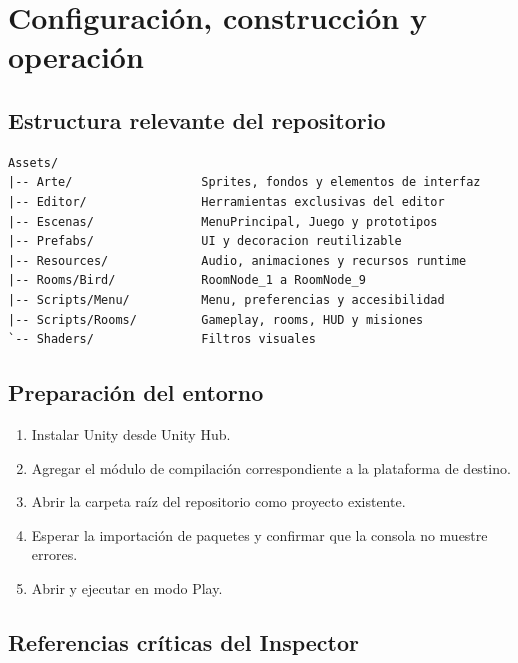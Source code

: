 \documentclass[11pt,a4paper,oneside]{report}
\newcommand{\code}[1]{\texttt{\detokenize{#1}}}
\begin{document}
\chapter{Configuración, construcción y operación}

\section{Estructura relevante del repositorio}

\begin{lstlisting}[style=projectcode]
Assets/
|-- Arte/                  Sprites, fondos y elementos de interfaz
|-- Editor/                Herramientas exclusivas del editor
|-- Escenas/               MenuPrincipal, Juego y prototipos
|-- Prefabs/               UI y decoracion reutilizable
|-- Resources/             Audio, animaciones y recursos runtime
|-- Rooms/Bird/            RoomNode_1 a RoomNode_9
|-- Scripts/Menu/          Menu, preferencias y accesibilidad
|-- Scripts/Rooms/         Gameplay, rooms, HUD y misiones
`-- Shaders/               Filtros visuales
\end{lstlisting}

\section{Preparación del entorno}

\begin{enumerate}
  \item Instalar Unity \code{6000.5.1f1} desde Unity Hub.
  \item Agregar el módulo de compilación correspondiente a la plataforma de destino.
  \item Abrir la carpeta raíz del repositorio como proyecto existente.
  \item Esperar la importación de paquetes y confirmar que la consola no muestre errores.
  \item Abrir  y ejecutar en modo Play.
\end{enumerate}

\section{Referencias críticas del Inspector}
\end{document}
